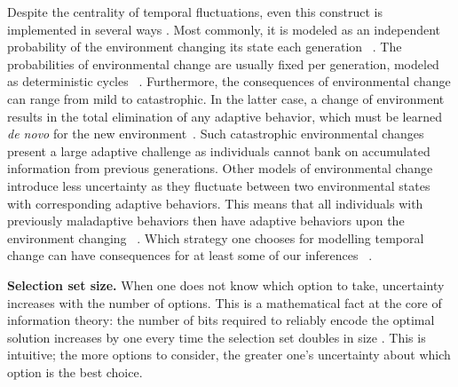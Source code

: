 \documentclass[letterpaper,11.5pt]{scrartcl}
\begin{document}
Despite the centrality of temporal fluctuations, even this construct is
implemented in several ways \cite{aoki2014evolution}. Most commonly, it is modeled
as an independent probability of the environment changing its state each
generation
~\cite{BoydRicherson1985,Rogers1988,Feldman1996,McElreath2005,Enquist2007,perreault2012bayesian,aoki2014evolution}.
The probabilities of environmental change are usually fixed per generation,
modeled as deterministic cycles ~\cite{Feldman1996, aoki2014evolution}.
Furthermore, the consequences of environmental change can range from mild to
catastrophic. In the latter case, a change of environment results in the total
elimination of any adaptive behavior, which must be learned \emph{de novo} for the
new environment~\cite{Rogers1988}. Such catastrophic environmental changes present
a large adaptive challenge as individuals cannot bank on accumulated information
from previous generations. Other models of environmental change introduce less
uncertainty as they fluctuate between two environmental states with corresponding
adaptive behaviors. This means that all individuals with previously maladaptive
behaviors then have adaptive behaviors upon the environment changing
~\cite{perreault2012bayesian}. Which strategy one chooses for modelling temporal
change can have consequences for at least some of our inferences
~\cite{aoki2014evolution}.


\textbf{Selection set size.}
When one does not know which option to take, uncertainty increases with the number of options. This is a mathematical fact at the core of information theory: the number of bits required to reliably encode the optimal solution increases by one every time the selection set doubles in size  \cite{mackay2003information}. 
This is intuitive; the more options to consider, the greater one's uncertainty about which option is the best choice. 
\end{document}
